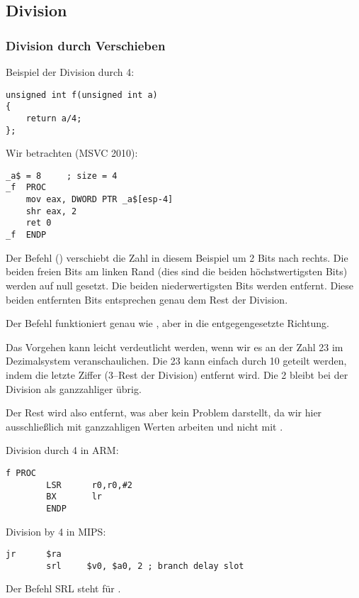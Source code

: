 \subsection{Division}

\subsubsection{Division durch Verschieben}
\label{division_by_shifting}

Beispiel der Division durch 4:

\begin{lstlisting}[style=customc]
unsigned int f(unsigned int a)
{
	return a/4;
};
\end{lstlisting}

Wir betrachten (MSVC 2010):

\begin{lstlisting}[caption=MSVC 2010,style=customasmx86]
_a$ = 8		; size = 4
_f	PROC
	mov	eax, DWORD PTR _a$[esp-4]
	shr	eax, 2
	ret	0
_f	ENDP
\end{lstlisting}

\label{SHR}

Der Befehl \SHR () verschiebt die Zahl in diesem Beispiel um 2
Bits nach rechts. Die beiden freien Bits am linken Rand (dies sind die beiden
höchstwertigsten Bits) werden auf null gesetzt. 
Die beiden niederwertigsten Bits werden entfernt. 
Diese beiden entfernten Bits entsprechen genau dem Rest der Division.


Der \SHR Befehl funktioniert genau wie \SHL, aber in die entgegengesetzte
Richtung.


Das Vorgehen kann leicht verdeutlicht werden, wenn wir es an der Zahl 23 im
Dezimalsystem veranschaulichen. Die 23 kann einfach durch 10 geteilt werden,
indem die letzte Ziffer (3--Rest der Division) entfernt wird. Die 2 bleibt bei
der Division als ganzzahliger  übrig.

Der Rest wird also entfernt, was aber kein Problem darstellt, da wir hier
ausschließlich mit ganzzahligen Werten arbeiten und nicht mit .

Division durch 4 in ARM:

\begin{lstlisting}[caption=\NonOptimizingKeilVI (\ARMMode),style=customasmARM]
f PROC
        LSR      r0,r0,#2
        BX       lr
        ENDP
\end{lstlisting}

Division by 4 in MIPS:

\begin{lstlisting}[caption=\Optimizing GCC 4.4.5 (IDA),style=customasmMIPS]
        jr      $ra
        srl     $v0, $a0, 2 ; branch delay slot
\end{lstlisting}

Der Befehl SRL steht für .
